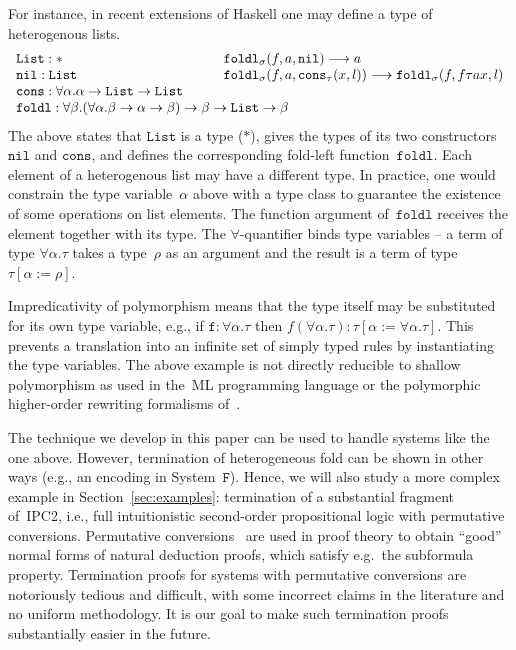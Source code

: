 \documentclass[a4paper,UKenglish,cleveref,autoref,numberwithinsect]{lipics-v2019}
\theoremstyle{definition}
\newcommand{\arrtype}{\rightarrow}
\newcommand{\subst}[2]{#1:=#2}
\newcommand{\red}{\longrightarrow}
\newcommand{\List}{\mathtt{List}}
\newcommand{\nil}{\mathtt{nil}}
\newcommand{\cons}{\mathtt{cons}}
\begin{document}
For instance, in recent extensions of Haskell one may define a type of
heterogenous lists.
\[
\begin{array}{ll}
  \List : * &
  \mathtt{foldl}_\sigma(f,a,\nil) \red a \\
  \mathtt{nil} : \List &
  \mathtt{foldl}_\sigma(f,a,\cons_\tau(x,l)) \red \mathtt{foldl}_\sigma(f,f \tau a x,l) \\
  \mathtt{cons} : \forall \alpha . \alpha \arrtype \List \arrtype \List \quad\quad \\
  \multicolumn{2}{l}{\mathtt{foldl} : \forall \beta . (\forall \alpha . \beta \arrtype \alpha \arrtype \beta) \arrtype \beta \arrtype \List \arrtype \beta}
\end{array}
\]
The above states that $\List$ is a type ($*$), gives the types of its
two constructors $\nil$ and $\cons$, and defines the corresponding
fold-left function~$\mathtt{foldl}$. Each element of a heterogenous
list may have a different type. In practice, one would
  constrain the type variable~$\alpha$ above with a type class to
  guarantee the existence of some operations on list elements.  The
function argument of~$\mathtt{foldl}$ receives the element together
with its type. The $\forall$-quantifier binds type variables -- a term
of type $\forall \alpha . \tau$ takes a type~$\rho$ as an argument and
the result is a term of type~$\tau[\subst{\alpha}{\rho}]$.
\pagebreak

Impredicativity of polymorphism means that the type itself may be
substituted for its own type variable, e.g., if $\mathtt{f} : \forall
\alpha . \tau$ then $f (\forall \alpha . \tau) :
\tau[\subst{\alpha}{\forall\alpha.\tau}]$. This prevents a translation
into an infinite set of simply typed rules by instantiating the type
variables. The above example is not directly reducible to shallow
polymorphism as used in the~ML programming language or the polymorphic
higher-order rewriting formalisms of~\cite{jou:oka:91,jou:rub:99}.

The technique we develop in this paper can be used to handle
systems like the one above. However, termination of heterogeneous
fold can be shown in other ways (e.g., an encoding in
System~$\mathtt{F}$). Hence, we will also study a more complex example
in Section~\ref{sec:examples}: termination of a substantial fragment
of~IPC2, i.e., full intuitionistic second-order propositional logic
with permutative conversions. Permutative
conversions~\cite[Chapter~6]{TroelstraSchwichtenberg1996} are used in
proof theory to obtain ``good'' normal forms of natural deduction
proofs, which satisfy e.g.~the subformula property. Termination proofs
for systems with permutative conversions are notoriously tedious and
difficult, with some incorrect claims in the literature and no uniform
methodology. It is our goal to make such termination proofs
substantially easier in the future.
\end{document}
